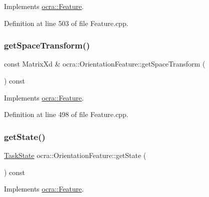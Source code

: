 Implements \hyperlink{classocra_1_1Feature_aeda4c2a5ffe638c3de30f8b91a11450e}{ocra\+::\+Feature}.



Definition at line 503 of file Feature.\+cpp.

\hypertarget{classocra_1_1OrientationFeature_ae820bfe2017c670eac6717fda7408c67}{}\label{classocra_1_1OrientationFeature_ae820bfe2017c670eac6717fda7408c67} 
\subsubsection{\texorpdfstring{get\+Space\+Transform()}{getSpaceTransform()}}
{\footnotesize\ttfamily const Matrix\+Xd \& ocra\+::\+Orientation\+Feature\+::get\+Space\+Transform (\begin{DoxyParamCaption}{ }\end{DoxyParamCaption}) const\hspace{0.3cm}{\ttfamily [virtual]}}



Implements \hyperlink{classocra_1_1Feature_a77eb324fb4da91fd50d0e761d2453ff3}{ocra\+::\+Feature}.



Definition at line 498 of file Feature.\+cpp.

\hypertarget{classocra_1_1OrientationFeature_a586d036d6676d9ff17d33db2dcc11cae}{}\label{classocra_1_1OrientationFeature_a586d036d6676d9ff17d33db2dcc11cae} 
\subsubsection{\texorpdfstring{get\+State()}{getState()}}
{\footnotesize\ttfamily \hyperlink{classocra_1_1TaskState}{Task\+State} ocra\+::\+Orientation\+Feature\+::get\+State (\begin{DoxyParamCaption}{ }\end{DoxyParamCaption}) const\hspace{0.3cm}{\ttfamily [virtual]}}



Implements \hyperlink{classocra_1_1Feature_a792434ceb793f25874b8fe42ae24c475}{ocra\+::\+Feature}.



